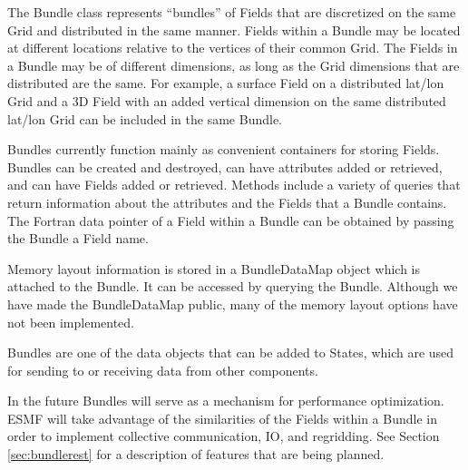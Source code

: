 
The Bundle class represents ``bundles'' of Fields that are 
discretized on the same Grid and distributed in the same manner.  
Fields within a Bundle may be located at different locations relative 
to the vertices of their common Grid.  The Fields in a Bundle may
be of different dimensions, as long as the Grid dimensions that 
are distributed are the same.  For example, a surface Field on 
a distributed lat/lon Grid and a 3D Field with an added vertical 
dimension on the same distributed lat/lon Grid can be included
in the same Bundle.
 
Bundles currently function mainly as convenient containers for storing 
Fields.  Bundles can be created and destroyed, can have attributes 
added or retrieved, and can have Fields added or retrieved.
Methods include a variety of queries that return information about 
the attributes and the Fields that a Bundle contains.  The Fortran 
data pointer of a Field within a Bundle can be obtained 
by passing the Bundle a Field name.  

Memory layout information is stored in a BundleDataMap object 
which is attached to the Bundle.  It can be accessed by querying the 
Bundle.  Although we have made the BundleDataMap public, many of 
the memory layout options have not been implemented.

Bundles are one of the data objects that can be added to States,
which are used for sending to or receiving data from other components.

In the future Bundles will serve as a mechanism for performance
optimization.  ESMF will take advantage of the similarities of the
Fields within a Bundle in order to implement collective communication,
IO, and regridding.  See Section \ref{sec:bundlerest} for a 
description of features that are being planned.





